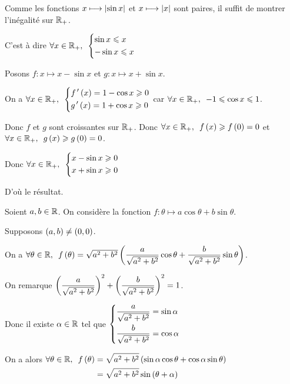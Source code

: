 \begin{dem}
Comme les fonctions \(x\longmapsto\left\lvert\sin x\right\rvert\) et \(x\longmapsto\left\lvert x\right\rvert\) sont paires, il suffit de montrer l'inégalité sur \(\mathbb{R}_+\).

C'est à dire \(\quantifs{\forall x\in\Rp}\begin{dcases}\sin x\leq x \\ -\sin x\leq x\end{dcases}\)

Posons \(f:x\mapsto x-\sin x\) et \(g:x\mapsto x+\sin x\).

On a \(\quantifs{\forall x\in\Rp}\begin{dcases}f\prim\paren{x}=1-\cos x\geq0 \\ g\prim\paren{x}=1+\cos x\geq0\end{dcases}\) car \(\quantifs{\forall x\in\Rp}-1\leq\cos x\leq1\).

Donc \(f\) et \(g\) sont croissantes sur \(\mathbb{R}_+\). Donc \(\quantifs{\forall x\in\Rp}f\paren{x}\geq f\paren{0}=0\) et \(\quantifs{\forall x\in\Rp}g\paren{x}\geq g\paren{0}=0\).

Donc \(\quantifs{\forall x\in\Rp}\begin{dcases}x-\sin x\geq0 \\ x+\sin x\geq0\end{dcases}\)

D'où le résultat.
\end{dem}

\begin{rem}
Soient \(a,b\in\mathbb{R}\). On considère la fonction \(f:\theta\mapsto a\cos\theta+b\sin\theta\).

Supposons \(\left(a,b\right)\not=\left(0,0\right)\).

On a \(\quantifs{\forall\theta\in\R}f\paren{\theta}=\sqrt{a^2+b^2}\paren{\dfrac{a}{\sqrt{a^2+b^2}}\cos\theta+\dfrac{b}{\sqrt{a^2+b^2}}\sin\theta}\).

On remarque \(\left(\dfrac{a}{\sqrt{a^2+b^2}}\right)^2+\left(\dfrac{b}{\sqrt{a^2+b^2}}\right)^2=1\).

Donc il existe \(\alpha\in\mathbb{R}\) tel que \(\begin{dcases}\dfrac{a}{\sqrt{a^2+b^2}}=\sin\alpha \\ \dfrac{b}{\sqrt{a^2+b^2}}=\cos\alpha\end{dcases}\)

On a alors \(\quantifs{\forall\theta\in\R}\begin{aligned}[t]
f\paren{\theta}&=\sqrt{a^2+b^2}\paren{\sin\alpha\cos\theta+\cos\alpha\sin\theta} \\
&=\sqrt{a^2+b^2}\sin\paren{\theta+\alpha}
\end{aligned}\)
\end{rem}